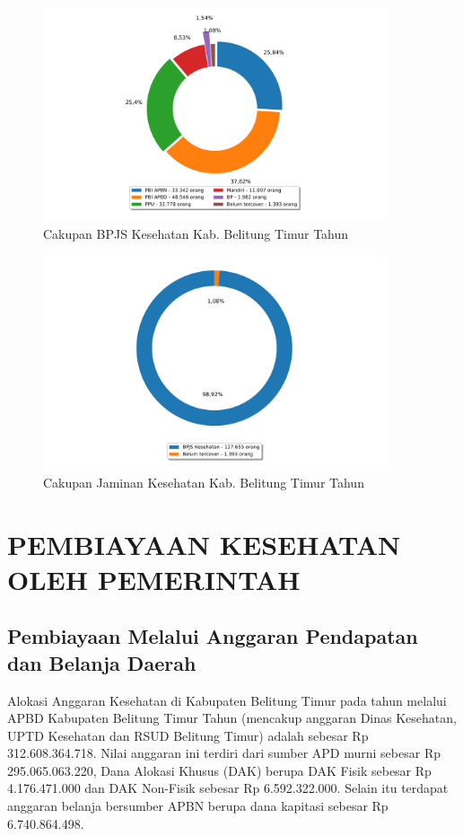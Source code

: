 \begin{figure}[H]
    \centering{}
    \includegraphics[width=0.9\textwidth]{bab_04/bab_04_01_jaminanKesehatan_a}
    \caption{Cakupan BPJS Kesehatan Kab. Belitung Timur Tahun \tP}
    \label{fig:Cakupan-BPJS}
\end{figure}

\begin{figure}[H]
    \centering{}
    \includegraphics[width=0.9\textwidth]{bab_04/bab_04_01_jaminanKesehatan_b}
    \caption{Cakupan Jaminan Kesehatan Kab. Belitung Timur Tahun \tP}
    \label{fig:Cakupan-Jamkes}
\end{figure}

\section[PEMBIAYAAN OLEH PEMERINTAH]{PEMBIAYAAN KESEHATAN OLEH PEMERINTAH}
\subsection{Pembiayaan Melalui Anggaran Pendapatan dan Belanja Daerah}
Alokasi Anggaran Kesehatan di Kabupaten Belitung Timur pada tahun \tP melalui APBD Kabupaten Belitung Timur Tahun \tP (mencakup anggaran Dinas Kesehatan, UPTD Kesehatan dan RSUD Belitung Timur) adalah sebesar Rp 312.608.364.718. Nilai anggaran ini terdiri dari sumber APD murni sebesar Rp 295.065.063.220, Dana Alokasi Khusus (DAK) berupa DAK Fisik sebesar Rp 4.176.471.000 dan DAK Non-Fisik sebesar Rp 6.592.322.000. Selain itu terdapat anggaran belanja bersumber APBN berupa dana kapitasi sebesar Rp 6.740.864.498.

